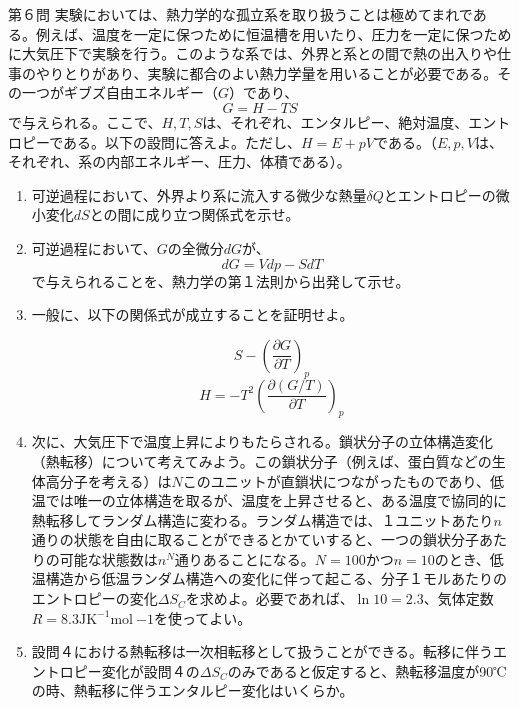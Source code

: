 \documentclass[fleqn]{jbook}
\begin{document}
\begin{question}{第６問}{}
実験においては、熱力学的な孤立系を取り扱うことは極めてまれである。例えば、温度を一定に保つために恒温槽を用いたり、圧力を一定に保つために大気圧下で実験を行う。このような系では、外界と系との間で熱の出入りや仕事のやりとりがあり、実験に都合のよい熱力学量を用いることが必要である。その一つがギブズ自由エネルギー（$G$）であり、
$$
G=H-TS
$$
で与えられる。ここで、$H,T,S$は、それぞれ、エンタルピー、絶対温度、エントロピーである。以下の設問に答えよ。ただし、$H=E+pV$である。（$E,p,V$は、それぞれ、系の内部エネルギー、圧力、体積である）。

\begin{enumerate}
\item 可逆過程において、外界より系に流入する微少な熱量$\delta Q$とエントロピーの微小変化$dS$との間に成り立つ関係式を示せ。

\item 可逆過程において、$G$の全微分$dG$が、
$$
dG=Vdp-SdT
$$
で与えられることを、熱力学の第１法則から出発して示せ。

\item
一般に、以下の関係式が成立することを証明せよ。

$$
S-\left(\frac{\partial G}{\partial T}\right)_p
$$
$$
H=-T^2\left(\frac{\partial (G/T)}{\partial T}\right)_p
$$

\item
次に、大気圧下で温度上昇によりもたらされる。鎖状分子の立体構造変化（熱転移）について考えてみよう。この鎖状分子（例えば、蛋白質などの生体高分子を考える）は$N$このユニットが直鎖状につながったものであり、低温では唯一の立体構造を取るが、温度を上昇させると、ある温度で協同的に熱転移してランダム構造に変わる。ランダム構造では、１ユニットあたり$n$通りの状態を自由に取ることができるとかていすると、一つの鎖状分子あたりの可能な状態数は$n^N$通りあることになる。$N=100$かつ$n=10$のとき、低温構造から低温ランダム構造への変化に伴って起こる、分子１モルあたりのエントロピーの変化$\Delta S_C$を求めよ。必要であれば、$\ln 10=2.3$、気体定数$R=8.3 \text{J} \text{K}^{-1}\text{mol}~{-1}$を使ってよい。

\item
設問４における熱転移は一次相転移として扱うことができる。転移に伴うエントロピー変化が設問４の$\Delta S_C$のみであると仮定すると、熱転移温度が90℃の時、熱転移に伴うエンタルピー変化はいくらか。
\end{enumerate}


\end{question}
\end{document}
